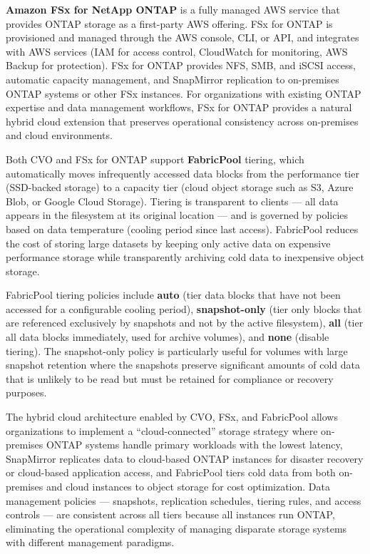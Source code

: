 \textbf{Amazon FSx for NetApp ONTAP} is a fully managed AWS service that provides ONTAP storage as a first-party AWS offering. FSx for ONTAP is provisioned and managed through the AWS console, CLI, or API, and integrates with AWS services (IAM for access control, CloudWatch for monitoring, AWS Backup for protection). FSx for ONTAP provides NFS, SMB, and iSCSI access, automatic capacity management, and SnapMirror replication to on-premises ONTAP systems or other FSx instances. For organizations with existing ONTAP expertise and data management workflows, FSx for ONTAP provides a natural hybrid cloud extension that preserves operational consistency across on-premises and cloud environments.

Both CVO and FSx for ONTAP support \textbf{FabricPool} tiering, which automatically moves infrequently accessed data blocks from the performance tier (SSD-backed storage) to a capacity tier (cloud object storage such as S3, Azure Blob, or Google Cloud Storage). Tiering is transparent to clients --- all data appears in the filesystem at its original location --- and is governed by policies based on data temperature (cooling period since last access). FabricPool reduces the cost of storing large datasets by keeping only active data on expensive performance storage while transparently archiving cold data to inexpensive object storage.

FabricPool tiering policies include \textbf{auto} (tier data blocks that have not been accessed for a configurable cooling period), \textbf{snapshot-only} (tier only blocks that are referenced exclusively by snapshots and not by the active filesystem), \textbf{all} (tier all data blocks immediately, used for archive volumes), and \textbf{none} (disable tiering). The snapshot-only policy is particularly useful for volumes with large snapshot retention where the snapshots preserve significant amounts of cold data that is unlikely to be read but must be retained for compliance or recovery purposes.

The hybrid cloud architecture enabled by CVO, FSx, and FabricPool allows organizations to implement a ``cloud-connected'' storage strategy where on-premises ONTAP systems handle primary workloads with the lowest latency, SnapMirror replicates data to cloud-based ONTAP instances for disaster recovery or cloud-based application access, and FabricPool tiers cold data from both on-premises and cloud instances to object storage for cost optimization. Data management policies --- snapshots, replication schedules, tiering rules, and access controls --- are consistent across all tiers because all instances run ONTAP, eliminating the operational complexity of managing disparate storage systems with different management paradigms.

